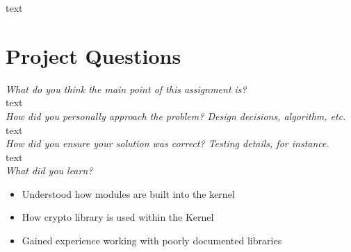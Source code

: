 \documentclass[letterpaper,10pt,titlepage]{article}
\begin{document}
text

\section{Project Questions}

\textit{What do you think the main point of this assignment is?}\\

text\\

\textit{How did you personally approach the problem? Design decisions, algorithm, etc.}\\

text\\

\textit{How did you ensure your solution was correct? Testing details, for instance.}\\

text \\

\textit{What did you learn?}\\
\begin{itemize}
\item Understood how modules are built into the kernel
\item How crypto library is used within the Kernel
\item Gained experience working with poorly documented libraries
\end{itemize}
\end{document}
